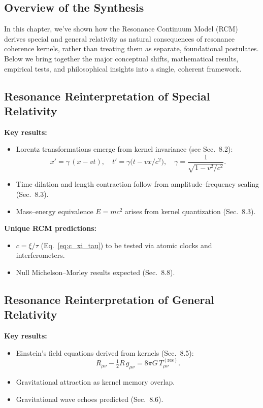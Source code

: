 \subsection{Overview of the Synthesis}

In this chapter, we’ve shown how the Resonance Continuum Model (RCM) derives special and general relativity as natural consequences of resonance coherence kernels, rather than treating them as separate, foundational postulates.  Below we bring together the major conceptual shifts, mathematical results, empirical tests, and philosophical insights into a single, coherent framework.

\subsection{Resonance Reinterpretation of Special Relativity}

\textbf{Key results:}
\begin{itemize}
  \item Lorentz transformations emerge from kernel invariance (see Sec.~8.2): 
    \[
      x' = \gamma\,(x - vt), 
      \quad
      t' = \gamma\bigl(t - vx/c^2\bigr),
      \quad
      \gamma = \frac{1}{\sqrt{1 - v^2/c^2}}.
    \]
  \item Time dilation and length contraction follow from amplitude–frequency scaling (Sec.~8.3).
  \item Mass–energy equivalence $E=mc^2$ arises from kernel quantization (Sec.~8.3).
\end{itemize}

\textbf{Unique RCM predictions:}
\begin{itemize}
  \item $c=\xi/\tau$ (Eq.~\ref{eq:c_xi_tau}) to be tested via atomic clocks and interferometers.
  \item Null Michelson–Morley results expected (Sec.~8.8).
\end{itemize}

\subsection{Resonance Reinterpretation of General Relativity}

\textbf{Key results:}
\begin{itemize}
  \item Einstein’s field equations derived from kernels (Sec.~8.5):
    \[
      R_{\mu\nu}-\tfrac12R\,g_{\mu\nu}
      = 8\pi G\,T_{\mu\nu}^{(\mathrm{res})}.
    \]
  \item Gravitational attraction as kernel memory overlap.
  \item Gravitational wave echoes predicted (Sec.~8.6).
\end{itemize}


